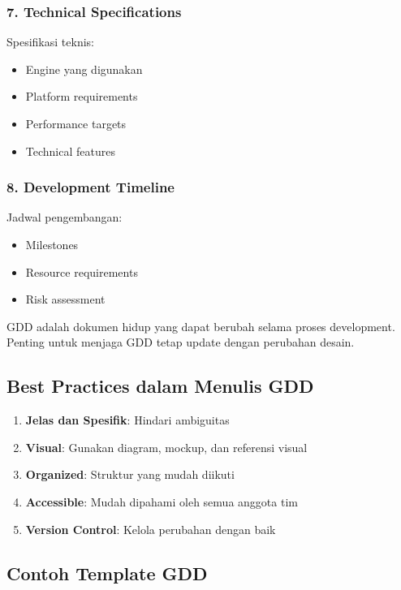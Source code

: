 \subsubsection{7. Technical Specifications}
Spesifikasi teknis:
\begin{itemize}
\item Engine yang digunakan
\item Platform requirements
\item Performance targets
\item Technical features
\end{itemize}

\subsubsection{8. Development Timeline}
Jadwal pengembangan:
\begin{itemize}
\item Milestones
\item Resource requirements
\item Risk assessment
\end{itemize}

\begin{catatan}
GDD adalah dokumen hidup yang dapat berubah selama proses development. Penting untuk menjaga GDD tetap update dengan perubahan desain.
\end{catatan}

\subsection{Best Practices dalam Menulis GDD}

\begin{enumerate}
\item \textbf{Jelas dan Spesifik}: Hindari ambiguitas
\item \textbf{Visual}: Gunakan diagram, mockup, dan referensi visual
\item \textbf{Organized}: Struktur yang mudah diikuti
\item \textbf{Accessible}: Mudah dipahami oleh semua anggota tim
\item \textbf{Version Control}: Kelola perubahan dengan baik
\end{enumerate}

\subsection{Contoh Template GDD}

